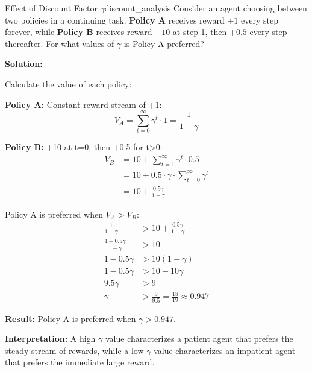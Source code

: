 \begin{example}{Effect of Discount Factor $\gamma$}{discount_analysis}
Consider an agent choosing between two policies in a continuing task. \textbf{Policy A} receives reward $+1$ every step forever, while \textbf{Policy B} receives reward $+10$ at step 1, then $+0.5$ every step thereafter. For what values of $\gamma$ is Policy A preferred?

\tcblower
\textbf{Solution:}

Calculate the value of each policy:

\textbf{Policy A:} Constant reward stream of +1:
\begin{equation}
V_A = \sum_{t=0}^{\infty} \gamma^t \cdot 1 = \frac{1}{1-\gamma}
\end{equation}

\textbf{Policy B:} +10 at t=0, then +0.5 for t>0:
\begin{align}
V_B &= 10 + \sum_{t=1}^{\infty} \gamma^t \cdot 0.5 \\
&= 10 + 0.5 \cdot \gamma \cdot \sum_{t=0}^{\infty} \gamma^t \\
&= 10 + \frac{0.5\gamma}{1-\gamma}
\end{align}

Policy A is preferred when $V_A > V_B$:
\begin{align}
\frac{1}{1-\gamma} &> 10 + \frac{0.5\gamma}{1-\gamma} \\
\frac{1 - 0.5\gamma}{1-\gamma} &> 10 \\
1 - 0.5\gamma &> 10(1-\gamma) \\
1 - 0.5\gamma &> 10 - 10\gamma \\
9.5\gamma &> 9 \\
\gamma &> \frac{9}{9.5} = \frac{18}{19} \approx 0.947
\end{align}

\textbf{Result:} Policy A is preferred when $\boxed{\gamma > 0.947}$.

\textbf{Interpretation:} A high $\gamma$ value characterizes a patient agent that prefers the steady stream of rewards, while a low $\gamma$ value characterizes an impatient agent that prefers the immediate large reward.
\end{example}

